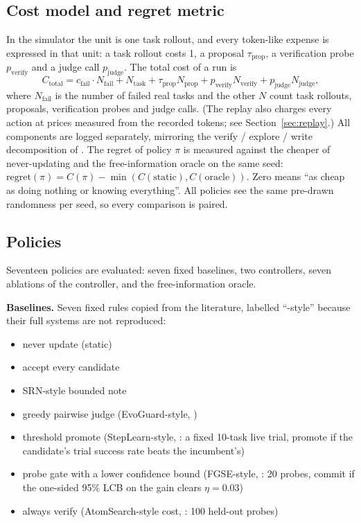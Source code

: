 \documentclass[11pt]{article}
\begin{document}
\subsection{Cost model and regret metric}
\label{sec:cost}
In the simulator the unit is one task rollout, and every token-like expense is expressed in
that unit: a task rollout costs 1, a proposal $\tau_{\text{prop}}$, a verification probe
$p_{\text{verify}}$ and a judge call $p_{\text{judge}}$.  The total cost of a run is
\[
C_{\text{total}} = c_{\text{fail}} \cdot N_{\text{fail}} + N_{\text{task}} + \tau_{\text{prop}} N_{\text{prop}}
  + p_{\text{verify}} N_{\text{verify}} + p_{\text{judge}} N_{\text{judge}},
\]
where $N_{\text{fail}}$ is the number of failed real tasks and the other $N$ count task
rollouts, proposals, verification probes and judge calls.  (The replay also charges
every action at prices measured from the recorded tokens; see Section~\ref{sec:replay}.)  All
components are logged separately, mirroring the verify / explore / write decomposition of
\citet{ristax2026}.  The regret of policy $\pi$ is measured against the cheaper of
never-updating and the free-information oracle on the same seed:
$\text{regret}(\pi) = C(\pi) - \min(C(\text{static}), C(\text{oracle}))$.  Zero means ``as
cheap as doing nothing or knowing everything''.  All policies see the same pre-drawn
randomness per seed, so every comparison is paired.

\subsection{Policies}
Seventeen policies are evaluated: seven fixed baselines, two controllers, seven ablations
of the controller, and the free-information oracle.

\textbf{Baselines.} Seven fixed rules copied from the literature, labelled ``-style''
because their full systems are not reproduced:
\begin{itemize}
  \item never update (static)
  \item accept every candidate
  \item SRN-style bounded note \citep{ristax2026}
  \item greedy pairwise judge (EvoGuard-style, \citealt{evo2026})
  \item threshold promote (StepLearn-style, \citealt{steplearn2026}: a fixed 10-task live
    trial, promote if the candidate's trial success rate beats the incumbent's)
  \item probe gate with a lower confidence bound (FGSE-style, \citealt{fgse2026}: 20 probes,
    commit if the one-sided 95\% LCB on the gain clears $\eta = 0.03$)
  \item always verify (AtomSearch-style cost, \citealt{atom2026}: 100 held-out probes)
\end{itemize}
\end{document}
